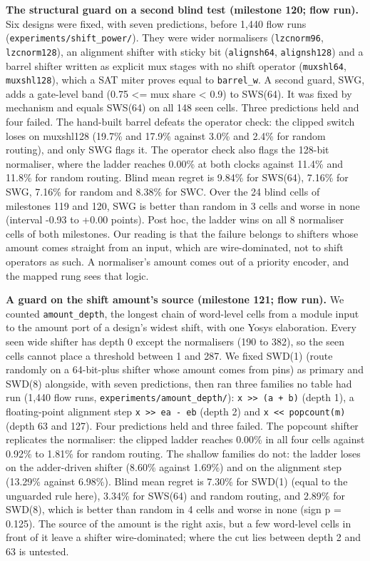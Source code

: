 \documentclass[conference]{IEEEtran}
\begin{document}
\textbf{The structural guard on a second blind test (milestone 120; flow
run).} Six designs were fixed, with seven predictions, before 1,440 flow
runs (\texttt{experiments/\allowbreak{}shift\_\allowbreak{}power/\allowbreak{}}). They were wider normalisers
(\texttt{lzcnorm96}, \texttt{lzcnorm128}), an alignment shifter with
sticky bit (\texttt{alignsh64}, \texttt{alignsh128}) and a barrel
shifter written as explicit mux stages with no shift operator
(\texttt{muxshl64}, \texttt{muxshl128}), which a SAT miter proves equal
to \texttt{barrel\_\allowbreak{}w}. A second guard, SWG, adds a gate-level band (0.75
\textless= mux share \textless{} 0.9) to SWS(64). It was fixed by
mechanism and equals SWS(64) on all 148 seen cells. Three predictions
held and four failed. The hand-built barrel defeats the operator check:
the clipped switch loses on muxshl128 (19.7\% and 17.9\% against 3.0\%
and 2.4\% for random routing), and only SWG flags it. The operator check
also flags the 128-bit normaliser, where the ladder reaches 0.00\% at
both clocks against 11.4\% and 11.8\% for random routing. Blind mean
regret is 9.84\% for SWS(64), 7.16\% for SWG, 7.16\% for random and
8.38\% for SWC. Over the 24 blind cells of milestones 119 and 120, SWG
is better than random in 3 cells and worse in none (interval -0.93 to
+0.00 points). Post hoc, the ladder wins on all 8 normaliser cells of
both milestones. Our reading is that the failure belongs to shifters
whose amount comes straight from an input, which are wire-dominated, not
to shift operators as such. A normaliser's amount comes out of a
priority encoder, and the mapped rung sees that logic.

\textbf{A guard on the shift amount's source (milestone 121; flow run).}
We counted \texttt{amount\_\allowbreak{}depth}, the longest chain of word-level cells
from a module input to the amount port of a design's widest shift, with
one Yosys elaboration. Every seen wide shifter has depth 0 except the
normalisers (190 to 382), so the seen cells cannot place a threshold
between 1 and 287. We fixed SWD(1) (route randomly on a 64-bit-plus
shifter whose amount comes from pins) as primary and SWD(8) alongside,
with seven predictions, then ran three families no table had run (1,440
flow runs, \texttt{experiments/\allowbreak{}amount\_\allowbreak{}depth/\allowbreak{}}):
\texttt{x\ \textgreater{}\textgreater{}\ (a\ +\ b)} (depth 1), a
floating-point alignment step
\texttt{x\ \textgreater{}\textgreater{}\ \textbar{}ea\ -\ eb\textbar{}}
(depth 2) and \texttt{x\ \textless{}\textless{}\ popcount(m)} (depth 63
and 127). Four predictions held and three failed. The popcount shifter
replicates the normaliser: the clipped ladder reaches 0.00\% in all four
cells against 0.92\% to 1.81\% for random routing. The shallow families
do not: the ladder loses on the adder-driven shifter (8.60\% against
1.69\%) and on the alignment step (13.29\% against 6.98\%). Blind mean
regret is 7.30\% for SWD(1) (equal to the unguarded rule here), 3.34\%
for SWS(64) and random routing, and 2.89\% for SWD(8), which is better
than random in 4 cells and worse in none (sign p = 0.125). The source of
the amount is the right axis, but a few word-level cells in front of it
leave a shifter wire-dominated; where the cut lies between depth 2 and
63 is untested.
\end{document}
